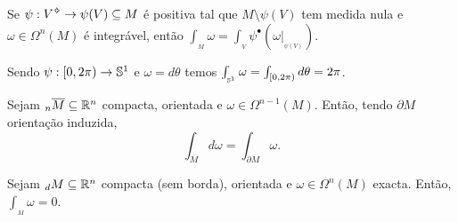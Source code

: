 \begin{corollary}
    Se \(\psi : V\ab \to \psi(V) \subseteq M\) é positiva tal que \(M \setminus \psi (V)\) tem medida nula e \(\omega \in \Omega^n(M)\) é integrável, então \(\int_{_M} \omega = \int_{_V} \psi^\bullet (\omega|_{_{\psi(V)}})\).
\end{corollary}

\begin{example}
    Sendo \(\psi: [0, 2\pi)  \to \mathbb{S}^{1}\) e \(\omega = d\theta\) temos \(\int_{_{\mathbb{S}^{1}}} \omega = \int_{[0, 2\pi)} d\theta = 2 \pi\).   
\end{example}

\hypertarget{thmStokesV2}{}
\begin{theorem}
    Sejam \(_n\overline{M}\subseteq \mathbb{R}^n\) compacta, orientada e \(\omega \in \Omega^{n-1}(M)\). Então, tendo \(\partial M\) orientação induzida,  
    \[\int_{\overline{M}} d\omega = \int_{\partial M} \omega.\]  
\end{theorem}


\begin{corollary}
    Sejam \(_dM\subseteq \mathbb{R}^n\) compacta (sem borda), orientada e \(\omega \in \Omega^n(M)\) exacta. Então, \(\int_{_M} \omega = 0 \). 
\end{corollary}

